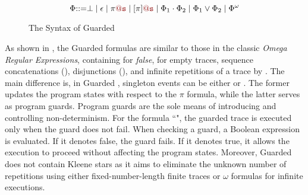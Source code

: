 \begin{figure}[!b]
\[\effect {::=}   \bot \mid \epsilon \mid \pi\loc{@s} \mid [\pi]\loc{@s} \mid \effect_1 \cdot \effect_2 
 \mid \effect_1 \vee \effect_2 \mid \effect^\omega\]
\caption{The Syntax of Guarded \code{\omegaRE}}
\label{fig:Syntax_of_Omega_RE}
\end{figure}



As shown in ,  
the Guarded \code{\omegaRE} formulas are similar to those in 
the classic \emph{Omega Regular Expressions},  
containing \code{\bot} for \emph{false}, \code{\epsilon} for empty traces, sequence concatenations (), disjunctions (), and infinite repetitions of a trace by \code{\effect^\omega}. 
The main difference is, in Guarded \code{\omegaRE}, singleton events can be either \code{\pi} or \code{[\pi]}. 
The former updates the program states with respect to the $\pi$ formula, while the latter serves as program guards. 
Program guards are the sole means of introducing and controlling non-determinism. 
For the formula ``\code{[\pi] \cdot \effect}", the guarded trace \code{\effect} is executed only when the guard does not fail. 
When checking a guard, a Boolean expression is evaluated. If it denotes false, the guard fails. If it denotes true, it allows the execution to proceed without affecting the program states. 
Moreover, Guarded~\code{\omegaRE} does not contain Kleene stars as it aims to eliminate the unknown number of repetitions using either fixed-number-length finite traces or $\omega$ formulas for infinite executions. 


